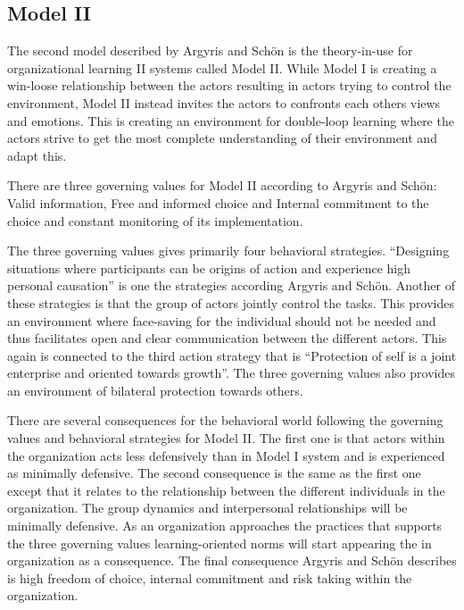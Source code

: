 \subsection{Model II} %
\label{sub:organizational_learning_ii}
The second model described by Argyris and Schön is the theory-in-use for organizational learning II systems called Model II. While Model I is creating a win-loose relationship between the actors resulting in actors trying to control the environment, Model II instead invites the actors to confronts each others views and emotions. This is creating an environment for double-loop learning where the actors strive to get the most complete understanding of their environment and adapt this. 

There are three governing values for Model II according to Argyris and Schön: Valid information, Free and informed choice and Internal commitment to the choice and constant monitoring of its implementation. 

The three governing values gives primarily four behavioral strategies. ``Designing situations where participants can be origins of action and experience high personal causation'' is one the strategies according Argyris and Schön. Another of these strategies is that the group of actors jointly control the tasks. This provides an environment where face-saving for the individual should not be needed and thus facilitates open and clear communication between the different actors. This again is connected to the third action strategy that is ``Protection of self is a joint enterprise and oriented towards growth''. The three governing values also provides an environment of bilateral protection towards others. 

There are several consequences for the behavioral world following the governing values and behavioral strategies for Model II. The first one is that actors within the organization acts less defensively than in Model I system and is experienced as minimally defensive. The second consequence is the same as the first one except that it relates to the relationship between the different individuals in the organization. The group dynamics and interpersonal relationships will be minimally defensive. As an organization approaches the practices that supports the three governing values learning-oriented norms will start appearing the in organization as a consequence. The final consequence Argyris and Schön describes is high freedom of choice, internal commitment and risk taking within the organization. 

